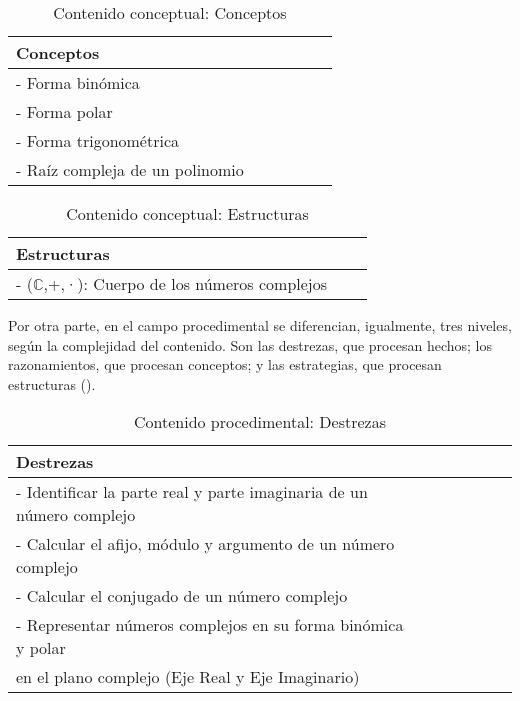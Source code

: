 \documentclass[../main.tex]{memoir}
\begin{document}
\begin{table}[H]
	\centering
	\begin{tabular}{lccccc}
		\toprule
		\hspace{2cm}Conceptos \\
		\midrule
		- Forma binómica \\
		- Forma polar \\
		- Forma trigonométrica\\
		- Raíz compleja de un polinomio \\
		\bottomrule
	\end{tabular}
	\caption{Contenido conceptual: Conceptos}
	\label{tab:conceptos2}
\end{table}

\begin{table}[H]
	\centering
	\begin{tabular}{lcc}
		\toprule
		\hspace{2.5cm}Estructuras \\
		\midrule
		 - ($\mathbb{C}$,+,·): Cuerpo de los números complejos \\
		\bottomrule
	\end{tabular}
	\caption{Contenido conceptual: Estructuras}
	\label{tab:estructuras}
\end{table}



Por otra parte, en el campo procedimental se diferencian, igualmente, tres niveles, según la complejidad del contenido. Son las destrezas, que procesan hechos; los razonamientos, que procesan conceptos; y las estrategias, que procesan estructuras (\cite{rico2016}). \\

\begin{table}[H]
	\centering
	\begin{tabular}{lcccccc}
		\toprule
		\hspace{5.5cm}Destrezas \\
		\midrule
		- Identificar la parte real y parte imaginaria de un número complejo \\
		- Calcular el afijo, módulo y argumento de un número complejo \\
		- Calcular el conjugado de un número complejo \\
		- Representar números complejos en su forma binómica y polar\\
		\hspace{0.2cm} en el plano complejo (Eje Real y Eje Imaginario) \\
		\bottomrule
	\end{tabular}
	\caption{Contenido procedimental: Destrezas}
	\label{tab:destrezas}
\end{table}
\end{document}
